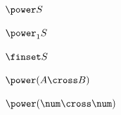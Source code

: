\documentclass[a4paper,10pt,fleqn]{article}
\begin{document}
\noindent
$\power S$


\noindent
$\power_1 S$


\noindent
$\finset S$


\noindent
$\power (A \cross B)$


\noindent
$\power (\num \cross \num)$
\end{document}
